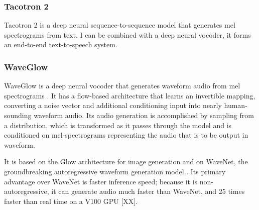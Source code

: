 \subsubsection{Tacotron 2}
Tacotron 2 is a deep neural sequence-to-sequence model that generates mel spectrograms from text. 
I can be combined with a deep neural vocoder, it forms an end-to-end text-to-speech system.
\subsubsection{WaveGlow}
%
WaveGlow is a deep neural vocoder that generates waveform audio from mel spectrograms \citep{waveglow}. It has a 
flow-based architecture that learns an invertible mapping, converting a noise vector and 
additional conditioning input into nearly human-sounding waveform audio. Its audio generation 
is accomplished by sampling from a distribution, which is transformed as it passes through the model 
and is conditioned on mel-spectrograms representing the audio that is to be output in waveform.

It is based on the Glow architecture for image generation \citep{glow} and on WaveNet, the groundbreaking 
autoregressive waveform generation model \citep{wavenet}. Its primary advantage over WaveNet is faster inference speed;
because it is non-autoregressive, it can generate audio much faster than WaveNet, and 25 times faster 
than real time on a V100 GPU [XX].




